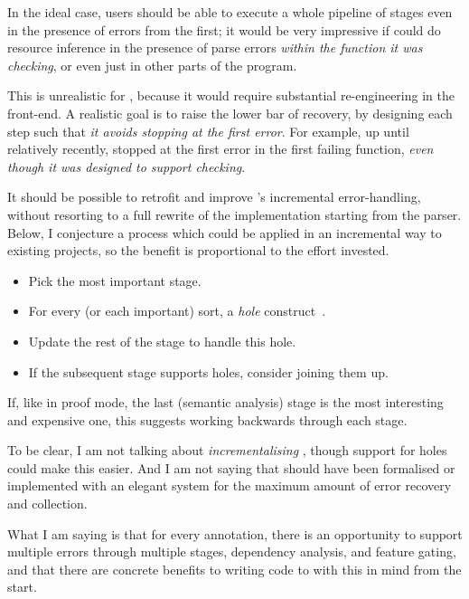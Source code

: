In the ideal case, users should be able to execute a whole pipeline of stages
even in the presence of errors from the first; it would be very impressive if
 could do resource inference in the presence of parse errors
\emph{within the function it was checking}, or even just in other parts of the
program.

This is unrealistic for , because it would require substantial
re-engineering in the  front-end. A realistic goal
is to raise the lower bar of recovery, by designing each step such that
\emph{it avoids stopping at the first error}. For example, up until relatively
recently,  stopped at the first error in the first failing function,
\emph{even though it was designed to support  checking}.

It should be possible to retrofit and improve 's incremental
error-handling, without resorting to a full rewrite of the implementation
starting from the parser. Below, I conjecture a process which could be
applied in an incremental way to existing projects, so the benefit is
proportional to the effort invested.
\begin{itemize}
    \item Pick the most important stage.
    \item For every (or each important) sort, a \emph{hole}
        construct~.
    \item Update the rest of the stage to handle this hole.
    \item If the subsequent stage supports holes, consider joining them up.
\end{itemize}
If, like in  proof mode, the last (semantic analysis) stage is the most
interesting and expensive one, this suggests working backwards through each
stage.

To be clear, I am not talking about \emph{incrementalising} , though
support for holes could make this easier. And I am not saying that 
should have been formalised or implemented with an elegant system for
the maximum amount of error recovery and collection.

What I am saying is that for every  annotation, there is an opportunity
to support multiple errors through multiple stages, dependency analysis, and
feature gating, and that there are concrete benefits to writing code to with
this in mind from the start.

